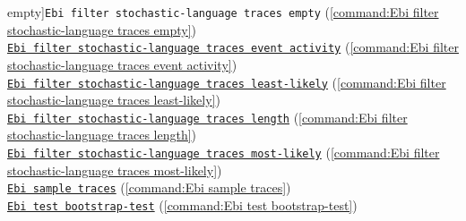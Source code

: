 {empty]{\texttt{Ebi filter stochastic-language traces empty}} (\cref{command:Ebi filter stochastic-language traces empty})\\\null\qquad\hyperref[command:Ebi filter stochastic-language traces event activity]{\texttt{Ebi filter stochastic-language traces event activity}} (\cref{command:Ebi filter stochastic-language traces event activity})\\\null\qquad\hyperref[command:Ebi filter stochastic-language traces least-likely]{\texttt{Ebi filter stochastic-language traces least-likely}} (\cref{command:Ebi filter stochastic-language traces least-likely})\\\null\qquad\hyperref[command:Ebi filter stochastic-language traces length]{\texttt{Ebi filter stochastic-language traces length}} (\cref{command:Ebi filter stochastic-language traces length})\\\null\qquad\hyperref[command:Ebi filter stochastic-language traces most-likely]{\texttt{Ebi filter stochastic-language traces most-likely}} (\cref{command:Ebi filter stochastic-language traces most-likely})\\\null\qquad\hyperref[command:Ebi sample traces]{\texttt{Ebi sample traces}} (\cref{command:Ebi sample traces})\\\null\qquad\hyperref[command:Ebi test bootstrap-test]{\texttt{Ebi test bootstrap-test}} (\cref{command:Ebi test bootstrap-test})
}
